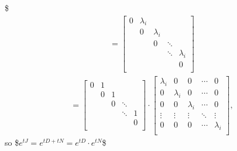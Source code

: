 \documentclass[letterpaper,10pt,english]{jupyterBook}
\begin{document}
\)\$
\begin{equation*}
\begin{split}
= \left[ {\begin{array}{ccccc}
    0 & \lambda_i &  &  & \\
     & 0 & \lambda_i &  &\\
     &  & 0 & \ddots &\\
     &  &  & \ddots & \lambda_i\\
     &  &  &  & 0\\
\end{array} } \right] 
\end{split}
\end{equation*}\begin{equation*}
\begin{split}
= \left[ {\begin{array}{ccccc}
    0 & 1 &  &  & \\
     & 0 & 1 &  &\\
     &  & 0 & \ddots &\\
     &  &  & \ddots & 1\\
     &  &  &  & 0\\
\end{array} } \right] \cdot \left[ {\begin{array}{ccccc}
    \lambda_i & 0 & 0 & \dotsm & 0\\
    0 & \lambda_i & 0 & \dotsm & 0\\
    0 & 0 & \lambda_i & \dotsm & 0\\
    \vdots & \vdots & \vdots & \ddots & \vdots\\
    0 & 0 & 0 & \dotsm & \lambda_i\\
\end{array} } \right],
\end{split}
\end{equation*}
\sphinxAtStartPar
so
\$\(
    e^{tJ} = e^{tD+tN} = e^{tD} \cdot e^{tN}
\)\$
\end{document}

